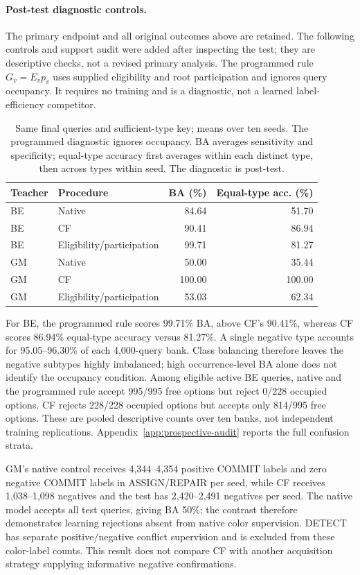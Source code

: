 \paragraph{Post-test diagnostic controls.}
The primary endpoint and all original outcomes above are retained.
The following controls and support audit were added after inspecting the test;
they are descriptive checks, not a revised primary analysis. The programmed
rule $G_v=E_vp_v$ uses supplied eligibility and root participation and ignores
query occupancy. It requires no training and is a diagnostic, not a learned
label-efficiency competitor.

\begin{table}[htbp]\centering\small
\begin{tabular}{llrr}
\toprule Teacher & Procedure & BA (\%) & Equal-type acc. (\%) \\
\midrule
BE & Native & 84.64 & 51.70 \\
BE & CF & 90.41 & 86.94 \\
BE & Eligibility/participation & 99.71 & 81.27 \\
GM & Native & 50.00 & 35.44 \\
GM & CF & 100.00 & 100.00 \\
GM & Eligibility/participation & 53.03 & 62.34 \\
\bottomrule
\end{tabular}
\caption{Same final queries and sufficient-type key; means over ten seeds.
The programmed diagnostic ignores occupancy. BA averages sensitivity and
specificity; equal-type accuracy first averages within each distinct
type, then across types within seed. The diagnostic is post-test.}
\label{tab:prospective-controls}
\end{table}

For BE, the programmed rule scores 99.71\% BA, above CF's 90.41\%,
whereas CF scores 86.94\% equal-type accuracy versus 81.27\%.
A single negative type accounts for 95.05--96.30\% of each 4,000-query bank.
Class balancing therefore leaves the negative subtypes highly imbalanced;
high occurrence-level BA alone does not identify the occupancy condition.
Among eligible active BE queries, native and the programmed rule accept
995/995 free options but reject 0/228 occupied options.
CF rejects 228/228 occupied options but accepts only
814/995 free options. These are pooled descriptive counts over
ten banks, not independent training replications. Appendix~\ref{app:prospective-audit}
reports the full confusion strata.

GM's native control receives 4,344--4,354 positive COMMIT labels and zero
negative COMMIT labels in ASSIGN/REPAIR per seed, while CF receives
1,038--1,098 negatives and the test has 2,420--2,491 negatives per seed.
The native model accepts all test queries, giving BA 50\%; the contrast
therefore demonstrates learning rejections absent from native color supervision.
DETECT has separate positive/negative conflict supervision and is excluded
from these color-label counts. This result does not compare CF with another
acquisition strategy supplying informative negative confirmations.

